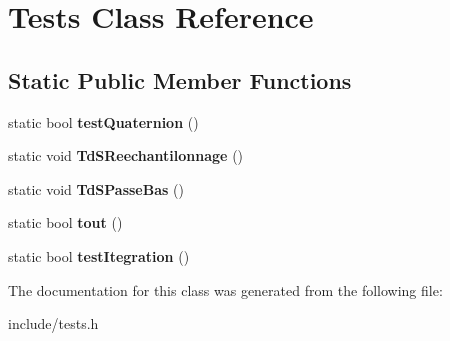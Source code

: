 \hypertarget{class_tests}{\section{Tests Class Reference}
\label{class_tests}
}
\subsection*{Static Public Member Functions}
\begin{DoxyCompactItemize}
\item 
\hypertarget{class_tests_af79ea64fe4d04f04ac728139b28d5e75}{static bool {\bfseries test\-Quaternion} ()}\label{class_tests_af79ea64fe4d04f04ac728139b28d5e75}

\item 
\hypertarget{class_tests_acf82a0eb28dfe3f3d0336494f25b27b9}{static void {\bfseries Td\-S\-Reechantilonnage} ()}\label{class_tests_acf82a0eb28dfe3f3d0336494f25b27b9}

\item 
\hypertarget{class_tests_a107085c2ab035222f2464ecc54b1c9dc}{static void {\bfseries Td\-S\-Passe\-Bas} ()}\label{class_tests_a107085c2ab035222f2464ecc54b1c9dc}

\item 
\hypertarget{class_tests_acf81e613fc3898b69a8703dfca53b403}{static bool {\bfseries tout} ()}\label{class_tests_acf81e613fc3898b69a8703dfca53b403}

\item 
\hypertarget{class_tests_abaa515a15ae022f2205621a8c79d9c36}{static bool {\bfseries test\-Itegration} ()}\label{class_tests_abaa515a15ae022f2205621a8c79d9c36}

\end{DoxyCompactItemize}


The documentation for this class was generated from the following file\-:\begin{DoxyCompactItemize}
\item 
include/tests.\-h\end{DoxyCompactItemize}
